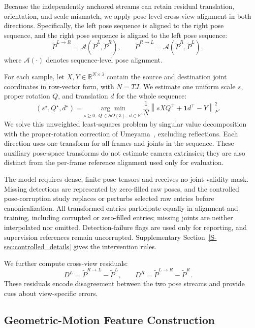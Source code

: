 \documentclass[preprint,12pt]{elsarticle}
\begin{document}
Because the independently anchored streams can retain residual translation, orientation, and scale mismatch, we apply pose-level cross-view alignment in both directions. Specifically, the left pose sequence is aligned to the right pose sequence, and the right pose sequence is aligned to the left pose sequence:
\[
\tilde{P}^{L \rightarrow R} = \mathcal{A}(\tilde{P}^{L}, \tilde{P}^{R}),
\qquad
\tilde{P}^{R \rightarrow L} = \mathcal{A}(\tilde{P}^{R}, \tilde{P}^{L}),
\]
where \(\mathcal{A}(\cdot)\) denotes sequence-level pose alignment.

For each sample, let \(X,Y\in\mathbb{R}^{N\times3}\) contain the source and destination joint coordinates in row-vector form, with \(N=TJ\). We estimate one uniform scale \(s\), proper rotation \(Q\), and translation \(d\) for the whole sequence:
\[
(s^\star,Q^\star,d^\star)=
\underset{s\geq0,\;Q\in SO(3),\;d\in\mathbb{R}^{3}}{\arg\min}
\frac{1}{N}\left\|sXQ^\top+\mathbf{1}d^\top-Y\right\|_F^2.
\]
We solve this unweighted least-squares problem by singular value decomposition with the proper-rotation correction of Umeyama~\cite{umeyama1991least}, excluding reflections. Each direction uses one transform for all frames and joints in the sequence. These auxiliary pose-space transforms do not estimate camera extrinsics; they are also distinct from the per-frame reference alignment used only for evaluation.

The model requires dense, finite pose tensors and receives no joint-validity mask. Missing detections are represented by zero-filled raw poses, and the controlled pose-corruption study replaces or perturbs selected raw entries before canonicalization. All transformed entries participate equally in alignment and training, including corrupted or zero-filled entries; missing joints are neither interpolated nor omitted. Detection-failure flags are used only for reporting, and supervision references remain uncorrupted. Supplementary Section~\ref{S-sec:controlled_details} gives the intervention rules.

We further compute cross-view residuals:
\[
D^{L} = \tilde{P}^{R \rightarrow L} - \tilde{P}^{L},
\qquad
D^{R} = \tilde{P}^{L \rightarrow R} - \tilde{P}^{R}.
\]
These residuals encode disagreement between the two pose streams and provide cues about view-specific errors.

\subsection{Geometric-Motion Feature Construction}
\label{subsec:feature_construction}
\end{document}

